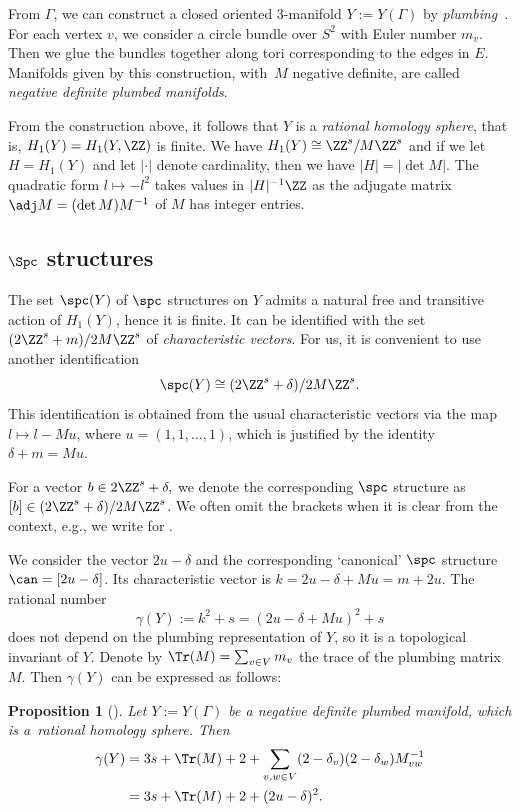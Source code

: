 \documentclass[10pt,a4paper]{amsart}
\newcounter{theorem}
\newtheorem{Proposition}[Theorem]{Proposition}
 { \theoremstyle{definition}
\newtheorem{Definition}[Theorem]{Definition}
\newtheorem{Note}[Theorem]{Note}
\newtheorem{Example}[Theorem]{Example}
\newtheorem{Remark}[Theorem]{Remark}
\newtheorem{Question}[theorem]{Question}
}
\begin{document}
From $\Gamma$, we can construct a closed oriented 3-manifold $Y := Y(\Gamma)$ by \emph{plumbing}~\cite{Neu81}. For each vertex $v$, we consider a circle bundle over $S^2$ with Euler number $m_v$. Then we glue the bundles together along tori corresponding to the edges in $E$. Manifolds given by this construction, with~$M$ negative definite, are called \emph{negative definite plumbed manifolds}.

From the construction above, it follows that $Y$ is a \emph{rational homology sphere}, that is, $H_1(Y) = H_1(Y,\ZZ)$ is finite. We have $H_1(Y) \cong \ZZ^s/M \ZZ^s$ and if we let $H = H_1(Y)$ and let $\lvert\cdot\rvert$ denote cardinality, then we have $\lvert H\rvert=\lvert\det M\rvert$. The quadratic form $l \mapsto -l^2$ takes values in $\lvert H\rvert^{-1}\ZZ$ as the adjugate matrix $\adj M = (\det M) M^{-1}$ of $M$ has integer entries.

\subsection[Spin\^{}c structures]{$\boldsymbol{\Spc}$ structures}\label{ss:spinc}

The set $\spc(Y)$ of $\spc$ structures on $Y$ admits a natural free and transitive action of $H_1(Y)$, hence it is finite. It can be identified with the set $(2\ZZ^s + m)/2M\ZZ^s$ of \emph{characteristic vectors}. For us, it is convenient to use another identification
\begin{equation}\label{eq:spinc_identif}
\spc(Y) \cong (2\ZZ^s + \delta)/2M\ZZ^s.
\end{equation}
This identification is obtained from the usual characteristic vectors via the map $l \mapsto l - Mu$, where $u = (1, 1, \dots, 1)$, which is justified by the identity $ \delta + m = Mu$.

For a vector $b \in 2\ZZ^s + \delta,$ we denote the corresponding $\spc$ structure as $[b] \in (2\ZZ^s + \delta)/2M\ZZ^s$. We often omit the brackets when it is clear from the context, e.g., we write  for \smash{$\Zhat_{[b]}$}.

We consider the vector $2u - \delta$ and the corresponding `canonical' $\spc$ structure $\can = [2u-\delta]$. Its characteristic vector is $k = 2u-\delta + Mu = m + 2u$. The rational number
\[
\gamma(Y) := k^2+s = (2u-\delta +Mu)^2+s
\]
does not depend on the plumbing representation of $Y$, so it is a topological invariant of $Y$.
Denote by $\Tr(M) = \sum_{v \in V}m_v$ the trace of the plumbing matrix $M$. Then $\gamma(Y)$ can be expressed as follows:
\begin{Proposition}[\cite{NeNi02}]\label{base-k2-s}
 Let $Y:=Y(\Gamma)$ be a negative definite plumbed manifold, which is a~rational homology sphere. Then
 \begin{align*}
 \gamma(Y) &{}= 3s + \Tr(M) + 2 + \sum_{v,w \in V} (2-\delta_v)(2-\delta_w)M_{vw}^{-1}\\
 &{}=3s + \Tr(M) + 2 + (2u-\delta)^2.
 \end{align*}
\end{Proposition}
\end{document}
